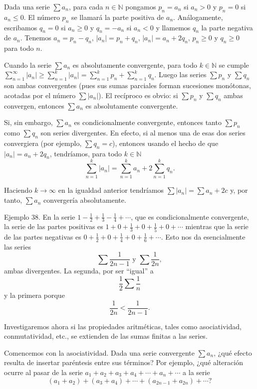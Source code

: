 \documentclass[12pt,oneside]{book}
\begin{document}
Dada una serie \(\sum a_n\), para cada \(n \in \mathbb{N}\) pongamos \(p_n = a_n\) si \(a_n > 0\) y \(p_n = 0\) si \(a_n \leq 0\). El número \(p_n\) se llamará la parte positiva de \(a_n\). Análogamente, escribamos \(q_n = 0\) si \(a_n \geq 0\) y \(q_n = -a_n\) si \(a_n < 0\) y llamemos \(q_n\) la parte negativa de \(a_n\). Tenemos \(a_n = p_n - q_n\), \(|a_n| = p_n + q_n\), \(|a_n| = a_n + 2q_n\), \(p_n \geq 0\) y \(q_n \geq 0\) para todo \(n\).

Cuando la serie \(\sum a_n\) es absolutamente convergente, para todo \(k \in \mathbb{N}\) se cumple \(\sum_{n=1}^{\infty} |a_n| \geq \sum_{n=1}^{k} |a_n| = \sum_{n=1}^{k} p_n + \sum_{n=1}^{k} q_n\). Luego las series \(\sum p_n\) y \(\sum q_n\) son ambas convergentes (pues sus sumas parciales forman sucesiones monótonas, acotadas por el número \(\sum |a_n|\)). El recíproco es obvio: si \(\sum p_n\) y \(\sum q_n\) ambas convergen, entonces \(\sum a_n\) es absolutamente convergente.

Si, sin embargo, \(\sum a_n\) es condicionalmente convergente, entonces tanto \(\sum p_n\) como \(\sum q_n\) son series divergentes. En efecto, si al menos una de esas dos series convergiera (por ejemplo, \(\sum q_n = c\)), entonces usando el hecho de que \(|a_n| = a_n + 2q_n\), tendríamos, para todo \(k \in \mathbb{N}\)
\[
\sum_{n=1}^{k} |a_n| = \sum_{n=1}^{k} a_n + 2\sum_{n=1}^{k} q_n.
\]

Haciendo \(k \to \infty\) en la igualdad anterior tendríamos \(\sum |a_n| = \sum a_n + 2c\) y, por tanto, \(\sum a_n\) convergería absolutamente.

Ejemplo 38. En la serie \(1 - \frac{1}{2} + \frac{1}{3} - \frac{1}{4} + \cdots\), que es condicionalmente convergente, la serie de las partes positivas es \(1 + 0 + \frac{1}{3} + 0 + \frac{1}{5} + 0 + \cdots\) mientras que la serie de las partes negativas es \(0 + \frac{1}{2} + 0 + \frac{1}{4} + 0 + \frac{1}{6} + \cdots\). Esto nos da esencialmente las series \[ \sum \frac{1}{2n-1} \text{ y } \sum \frac{1}{2n}, \] ambas divergentes. La segunda, por ser “igual” a \[ \frac{1}{2} \sum \frac{1}{n} \] y la primera porque \[ \frac{1}{2n} < \frac{1}{2n-1}. \]

Investigaremos ahora si las propiedades aritméticas, tales como asociatividad, conmutatividad, etc., se extienden de las sumas finitas a las series.

Comencemos con la asociatividad. Dada una serie convergente \(\sum a_n\), ¿qué efecto resulta de insertar paréntesis entre sus términos? Por ejemplo, ¿qué alteración ocurre al pasar de la serie \(a_1 + a_2 + a_3 + a_4 + \cdots + a_n + \cdots\) a la serie
\[ (a_1 + a_2) + (a_3 + a_4) + \cdots + (a_{2n-1} + a_{2n}) + \cdots ?\]
\end{document}
